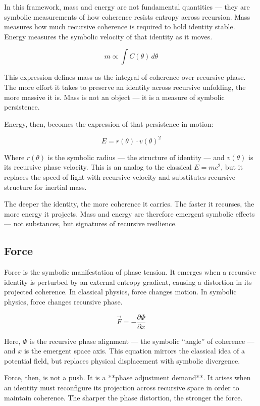 \documentclass[12pt]{article}
\begin{document}
In this framework, mass and energy are not fundamental quantities — they are symbolic measurements of how coherence resists entropy across recursion. Mass measures how much recursive coherence is required to hold identity stable. Energy measures the symbolic velocity of that identity as it moves.

\[
m \propto \int C(\theta)\, d\theta
\]

This expression defines mass as the integral of coherence over recursive phase. The more effort it takes to preserve an identity across recursive unfolding, the more massive it is. Mass is not an object — it is a measure of symbolic persistence.

Energy, then, becomes the expression of that persistence in motion:

\[
E = r(\theta) \cdot v(\theta)^2
\]

Where \(r(\theta)\) is the symbolic radius — the structure of identity — and \(v(\theta)\) is its recursive phase velocity. This is an analog to the classical \(E = mc^2\), but it replaces the speed of light with recursive velocity and substitutes recursive structure for inertial mass.

The deeper the identity, the more coherence it carries. The faster it recurses, the more energy it projects. Mass and energy are therefore emergent symbolic effects — not substances, but signatures of recursive resilience.

\subsection{Force}

Force is the symbolic manifestation of phase tension. It emerges when a recursive identity is perturbed by an external entropy gradient, causing a distortion in its projected coherence. In classical physics, force changes motion. In symbolic physics, force changes recursive phase.

\[
\vec{F} = -\frac{\partial \Phi}{\partial x}
\]

Here, \(\Phi\) is the recursive phase alignment — the symbolic “angle” of coherence — and \(x\) is the emergent space axis. This equation mirrors the classical idea of a potential field, but replaces physical displacement with symbolic divergence.

Force, then, is not a push. It is a **phase adjustment demand**. It arises when an identity must reconfigure its projection across recursive space in order to maintain coherence. The sharper the phase distortion, the stronger the force.
\end{document}
